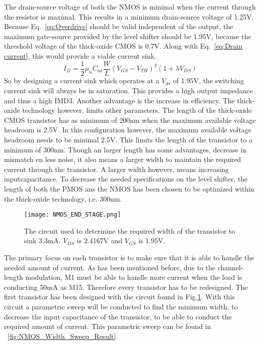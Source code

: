 The drain-source voltage of both the NMOS is minimal when the current through the resistor is maximal. This results in a minimum drain-source voltage of 1.25V. Because Eq.~\ref{eq:Overdrive} should be valid independent of the output, the maximum gate-source provided by the level shifter should be 1.95V, because the threshold voltage of the thick-oxide CMOS is 0.7V. Along with Eq.~\ref{eq:Drain current}, this would provide a viable current sink.
\begin{equation}{I_D = \frac{1}{2}\mu_n C_{ox}\frac{W}{L}(V_{GS}-V_{TH})^2(1+\lambda V_{DS})}\label{eq:Drain current}\end{equation}
So by designing a current sink which operates at a $V_{gs}$ of 1.95V, the  switching current sink will always be in saturation. This provides a high output impedance and thus a high IMD3. Another advantage is the increase in efficiency.
The thick-oxide technology however, limits other parameters. The length of the thick-oxide CMOS transistor has as minimum of 200nm when the maximum available voltage headroom is 2.5V. In this configuration however, the maximum available voltage headroom needs to be minimal 2.5V. This limits the length of the transistor to a minimum of 300nm. Though an larger length has some advantages, decrease in mismatch en less noise, it also means a larger width to maintain the required current through the transistor. A larger width however, means increasing inputcapacitance. To decrease the needed specifications on the level shifter, the length of both the PMOS ans the NMOS has been chosen to be optimized within the thick-oxide technology, i.e. 300nm.\\
\begin{figure}[ht!]
\begin{center}
\texttt{[image: NMOS\_END\_STAGE.png]}
\caption{The circuit used to determine the required width of the transistor to sink 3.3mA. $V_{DS}$ is 2.4167V and $V_{GS}$ is 1.95V.}
\label{fig:NMOS_Width_Sweep}
\end{center}
\end{figure}
The primary focus on each transistor is to make sure that it is able to handle the needed amount of current. As has been mentioned before, due to the channel-length modulation, M1 must be able to handle more current when the load is conducting 50mA as M15. Therefore every transistor has to be redesigned. The first transistor has been designed with the circuit found in Fig.\ref{fig:NMOS_Width_Sweep}. With this circuit a parametric sweep will be conducted to find the minimum width, to decrease the input capacitance of the transistor, to be able to conduct the required amount of current. This parametric sweep can be found in ~\ref{fig:NMOS_Width_Sweep_Result}.
